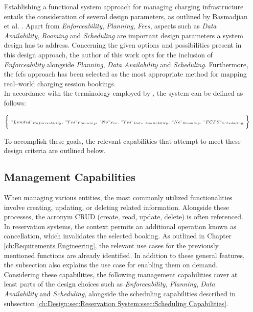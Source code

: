 Establishing a functional system approach for managing charging infrastructure entails the consideration of several design parameters, as outlined by Basmadjian et al. \cite{basmadjian_reference_2020}. Apart from \textit{Enforceability}, \textit{Planning}, \textit{Fees}, aspects such as \textit{Data Availability}, \textit{Roaming} and \textit{Scheduling} are important design parameters a system design has to address.
Concerning the given options and possibilities present in this design approach, the author of this work opts for the inclusion of \textit{Enforceability} alongside \textit{Planning}, \textit{Data Availability} and \textit{Scheduling}. 
Furthermore, the \acrshort{fcfs} approach has been selected as the most appropriate method for mapping real--world charging session bookings.\\
\noindent In accordance with the terminology employed by \cite{basmadjian_reference_2020}, the system can be defined as follows:

\begin{eqnarray*}
\scriptstyle \biggl\{\ "Limited"_{Enforceability},\ "Yes"_{Planning},\ "No"_{Fee},\ "Yes"_{Data\ Availability},\ "No"_{Roaming},\ "FCFS"_{Scheduling}\ \biggr\}
\end{eqnarray*}

\noindent To accomplish these goals, the relevant capabilities that attempt to meet these design criteria are outlined below.

\subsection{Management Capabilities}
\label{ch:Design:sec:Reservation System:ssec:Management Capabilities}

When managing various entities, the most commonly utilized functionalities involve creating, updating, or deleting related information. Alongside these processes, the acronym CRUD (create, read, update, delete) is often referenced. In reservation systems, the context permits an additional operation known as cancellation, which invalidates the selected booking.
As outlined in Chapter \ref{ch:Requirements Engineering}, the relevant use cases for the previously mentioned functions are already identified. In addition to these general features, the subsection also explains the use case for enabling them on demand.
Considering these capabilities, the following management capabilities cover at least parts of the design choices such as \textit{Enforceability}, \textit{Planning}, \textit{Data Availability} and \textit{Scheduling}, alongside the scheduling capabilities described in subsection \ref{ch:Design:sec:Reservation System:ssec:Scheduling Capabilities}.


